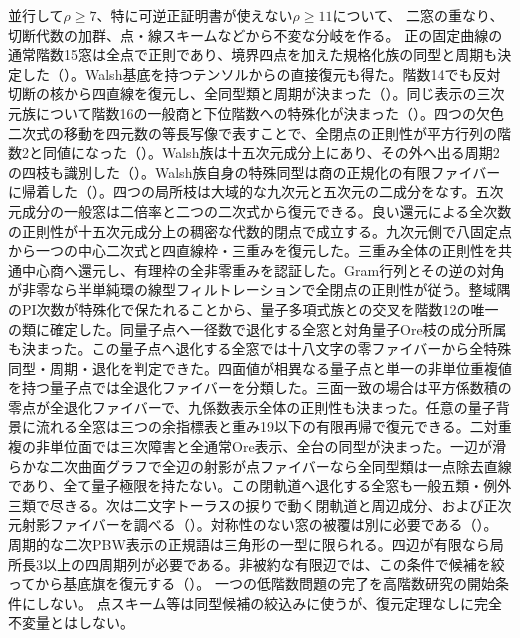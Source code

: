 \documentclass[11pt,a4paper]{ltjsarticle}
\begin{document}
並行して$\rho\ge7$、特に可逆正証明書が使えない$\rho\ge11$について、
二窓の重なり、切断代数の加群、点・線スキームなどから不変な分岐を作る。
正の固定曲線の通常階数15窓は全点で正則であり、境界四点を加えた規格化族の同型と周期も決定した（）。Walsh基底を持つテンソルからの直接復元も得た。階数14でも反対切断の核から四直線を復元し、全同型類と周期が決まった（）。同じ表示の三次元族について階数16の一般商と下位階数への特殊化が決まった（）。四つの欠色二次式の移動を四元数の等長写像で表すことで、全閉点の正則性が平方行列の階数2と同値になった（）。Walsh族は十五次元成分上にあり、その外へ出る周期2の四枝も識別した（）。Walsh族自身の特殊同型は商の正規化の有限ファイバーに帰着した（）。四つの局所枝は大域的な九次元と五次元の二成分をなす。五次元成分の一般窓は二倍率と二つの二次式から復元できる。良い還元による全次数の正則性が十五次元成分上の稠密な代数的閉点で成立する。九次元側で八固定点から一つの中心二次式と四直線枠・三重みを復元した。三重み全体の正則性を共通中心商へ還元し、有理枠の全非零重みを認証した。Gram行列とその逆の対角が非零なら半単純環の線型フィルトレーションで全閉点の正則性が従う。整域隅のPI次数が特殊化で保たれることから、量子多項式族との交叉を階数12の唯一の類に確定した。同量子点へ一径数で退化する全窓と対角量子Ore枝の成分所属も決まった。この量子点へ退化する全窓では十八文字の零ファイバーから全特殊同型・周期・退化を判定できた。四面値が相異なる量子点と単一の非単位重複値を持つ量子点では全退化ファイバーを分類した。三面一致の場合は平方係数積の零点が全退化ファイバーで、九係数表示全体の正則性も決まった。任意の量子背景に流れる全窓は三つの余指標表と重み19以下の有限再帰で復元できる。二対重複の非単位面では三次障害と全通常Ore表示、全台の同型が決まった。一辺が滑らかな二次曲面グラフで全辺の射影が点ファイバーなら全同型類は一点除去直線であり、全て量子極限を持たない。この閉軌道へ退化する全窓も一般五類・例外三類で尽きる。次は二文字トーラスの捩りで動く閉軌道と周辺成分、および正次元射影ファイバーを調べる（）。対称性のない窓の被覆は別に必要である（）。
周期的な二次PBW表示の正規語は三角形の一型に限られる。四辺が有限なら局所長3以上の四周期列が必要である。非被約な有限辺では、この条件で候補を絞ってから基底旗を復元する（）。
一つの低階数問題の完了を高階数研究の開始条件にしない。
点スキーム等は同型候補の絞込みに使うが、復元定理なしに完全不変量とはしない。
\end{document}
